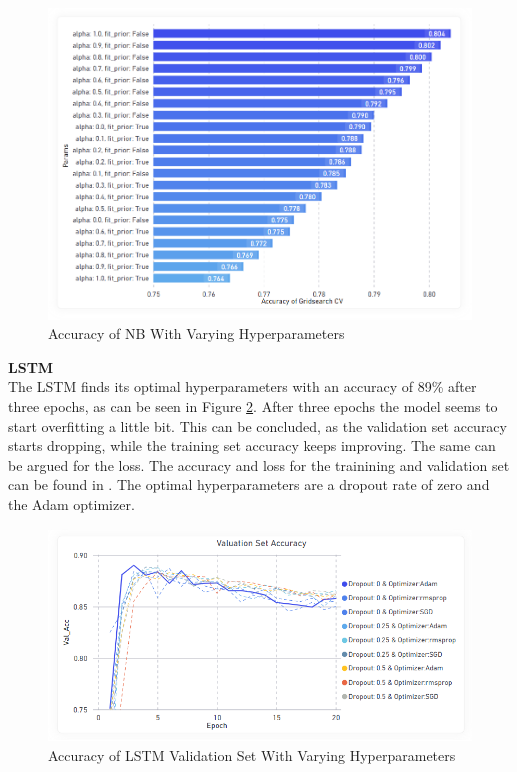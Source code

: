 \documentclass[11pt, a4paper]{article}
\begin{document}
\begin{figure}[!htb]
    \centering
    \includegraphics[scale=0.43]{NB_hyperparam.png}
    \caption{Accuracy of NB With Varying Hyperparameters}
    \label{fig:nb_hyperparam}
\end{figure}

\newpage
\noindent\textbf{LSTM}\\
The LSTM finds its optimal hyperparameters with an accuracy of 89\% after three epochs, as can be seen in Figure \ref{fig:LSTM_Accuracy_Val_Set}.
After three epochs the model seems to start overfitting a little bit. This can be concluded, as the validation set accuracy starts dropping, while the training set
accuracy keeps improving. The same can be argued for the loss. The accuracy and loss for the trainining and validation set can be found in .
The optimal hyperparameters are a dropout rate of zero and the Adam optimizer. \\

\begin{figure}[!hb]
    \centering
    \includegraphics[scale=0.54]{LSTM_Accuracy_Val_Set.PNG}
    \caption{Accuracy of LSTM Validation Set With Varying Hyperparameters}
    \label{fig:LSTM_Accuracy_Val_Set}
\end{figure}
\end{document}
